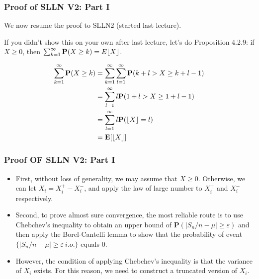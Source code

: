 \documentclass[handout]{beamer}
\newcommand{\BP}{\mathbf{P}}
\newcommand{\BE}{\mathbf{E}}
\DeclarePairedDelimiter\floor{\lfloor}{\rfloor}
\begin{document}
\frame
{
\frametitle{Proof of SLLN V2: Part I}

We now resume the proof to SLLN2 (started last lecture). 
\newline

If you didn't show this on your own after last lecture, let's do Proposition 4.2.9: if $X \ge 0$, then $\sum_{k=1}^{\infty} \BP(X \ge k) = E\floor{X}$.
\newline

\begin{align*}
\sum_{k=1}^{\infty} \BP(X \ge k) &= \sum_{k=1}^{\infty} \sum_{l=1}^{\infty} \BP( k + l > X \ge k+l-1) \\
&= \sum_{l=1}^{\infty} l \BP( 1 + l > X \ge 1+l-1) \\
&= \sum_{l=1}^{\infty} l \BP( \floor{X} = l) \\
&= \BE[\floor{X}]
\end{align*}
}



\frame
{
  \frametitle{Proof OF SLLN V2: Part I}

   \begin{itemize}
   \item<1-> First, without loss of generality, we may assume that $X\geq 0$. Otherwise, we can let $X_i=X_i^+-X_i^-$, and apply the law of large number to $X_i^+$ and $X_i^-$ respectively. 
   
      \item<2->[-] Second, to prove almost sure convergence, the most reliable route is to use Chebchev's inequality to obtain an upper bound of $\BP( |S_n/n-\mu|\geq \varepsilon)$ and then apply the Borel-Cantelli lemma to show that the probability of event $\{|S_n/n-\mu|\geq \varepsilon\ i.o.\}$ equals 0. 
	      
      \item<3->[-] However, the condition of applying Chebchev's inequality is that the variance of $X_i$ exists. For this reason, we need to construct a truncated version of $X_i$. 
                                            
\end{itemize}
}
\end{document}

